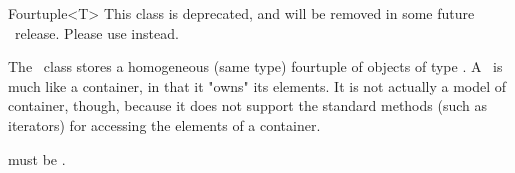 \begin{ccRefClass}{Fourtuple<T>}
  This class is deprecated, and will be removed in some future \cgal\ release.
  Please use  instead.
  
  \begin{ccDeprecated}
  \ccDefinition The \ccRefName\ class stores a homogeneous (same type)
  fourtuple of objects of type .  A \ccRefName\ is much like a
  container, in that it "owns" its elements. It is not actually a model of
  container, though, because it does not support the standard methods (such as
  iterators) for accessing the elements of a container.

  
  \ccRequirements {} must be .


  \ccTypes

  \ccGlue
  \ccGlue
  \ccGlue

  \ccCreation
  
  
  \end{ccDeprecated}
\end{ccRefClass}



